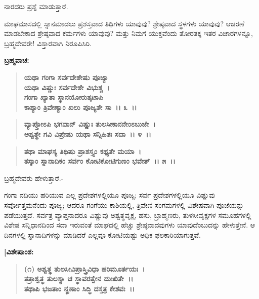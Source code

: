 \begin{flushleft}
ನಾರದರು ಪ್ರಶ್ನೆ ಮಾಡುತ್ತಾರೆ.
\end{flushleft}

ಮಾಘಮಾಸದಲ್ಲಿ ಸ್ನಾನಮಾಡಲು ಪ್ರಶಸ್ತವಾದ ತಿಥಿಗಳು ಯಾವುವು? ಶ್ರೇಷ್ಠವಾದ ಸ್ಥಳಗಳು ಯಾವುವು? ಆಚರಣೆ ಮಾಡಬೇಕಾದ ಶ್ರೇಷ್ಠವಾದ ಕರ್ಮಗಳು ಯಾವುವು? ಮತ್ತು ನಿಮಗೆ ಯುಕ್ತವೆಂದು ತೋರತಕ್ಕ ಇತರ ವಿಚಾರಗಳನ್ನೂ, ಬ್ರಹ್ಮದೇವರೇ! ವಿಸ್ತಾರವಾಗಿ ನಿರೂಪಿಸಿರಿ.

\noindent
\textbf{ಬ್ರಹ್ಮವಾಚ:\enginline{-}}

\begin{verse}
\textbf{ಯಥಾ ಗಂಗಾ ಸರ್ವದೇಶೇಷು ಪೂಜ್ಯಾ}\\\textbf{ಯಥಾ ವಿಷ್ಣುಃ ಸರ್ವದೇಶೇ ವಿಭುಶ್ಚ~। }\\\textbf{ಗಂಗಾ ಖ್ಯಾತಾ ಸ್ಥಾನಯೋರುತ್ಕಟಾಪಿ} \\\textbf{ಕಾಶ್ಯಾಂ ತ್ರಿವೇಣ್ಯಾಂ ಖಲು ಪೂಜ್ಯತೇ ಸಾ~।। ೩~।।}
\end{verse}

\begin{verse}
\textbf{ವ್ಯಾಪ್ತೋಽಪಿ ಭಗವಾನ್ ವಿಷ್ಣುಃ ತುಲಸೀಕಾನನೇಂಽಬುಜೇ~।}\\\textbf{ಅಶ್ವತ್ಥೇ ಗವಿ ವಿಪ್ರೇಷು ಯಥಾ ಸನ್ನಿಹಿತಃ ಸದಾ~।। ೪~।।}
\end{verse}

\begin{verse}
\textbf{ತಥಾ ಮಾಘಸ್ಯ ತಿಥಿಷು ಪ್ರಾಶಸ್ತ್ಯಂ ಕಥ್ಯತೇ ಮಯಾ~।}\\\textbf{ತಸ್ಕಾಂ ಸ್ನಾನಾದಿಕಂ ಸರ್ವಂ ಕೋಟಿಕೋಟಿಗುಣಂ ಭವೇತ್~।। ೫~।।}
\end{verse}

\begin{flushleft}
ಬ್ರಹ್ಮದೇವರು ಹೇಳುತ್ತಾರೆ.-
\end{flushleft}

ಗಂಗಾ ನದಿಯು ಹರಿಯುವ ಎಲ್ಲ ಪ್ರದೇಶಗಳಲ್ಲಿಯೂ ಪೂಜ್ಯ; ಸರ್ವ ಪ್ರದೇಶಗಳಲ್ಲಿಯೂ ವಿಷ್ಣುವು ಸರ್ವೋತ್ತಮನೆಂದು ಪೂಜ್ಯ; ಆದರೂ ಗಂಗೆಯು ಕಾಶಿಯಲ್ಲಿ, ತ್ರಿವೇಣಿ ಸಂಗಮಗಳಲ್ಲಿ ವಿಶೇಷವಾಗಿ ಪೂಜೆಯನ್ನು ಪಡೆಯುತ್ತದೆ. ಸರ್ವತ್ರ ವ್ಯಾಪ್ತನಾದರೂ ವಿಷ್ಣುವು ಅಶ್ವತ್ಥವೃಕ್ಷ, ಹಸು, ಬ್ರಾಹ್ಮಣರು, ತುಳಸೀವೃಕ್ಷಗಳ ಸಮೂಹಗಳಲ್ಲಿ ವಿಶೇಷ ಸನ್ನಿಧಾನದಿಂದ ಸದಾ ಇರುವಂತೆ ಮಾಘದಲ್ಲಿ ಹೆಚ್ಚು ಶ್ರೇಷ್ಠವಾದವುಗಳು ಯಾವುದೆಂಬುದನ್ನು ಹೇಳುತ್ತೇನೆ. ಆ ದಿನಗಳಲ್ಲಿ ಸ್ನಾನಾದಿಗಳನ್ನು ಮಾಡಿದರೆ ಎಲ್ಲವೂ ಕೋಟಿಯಷ್ಟು ಅಧಿಕ ಫಲಕಾರಿಯಾಗುತ್ತವೆ.

\begin{flushleft}
\textbf{[ವಿಶೇಷಾಂಶ:}
\end{flushleft}

\begin{verse}
\textbf{(೧) ಅಶ್ವತ್ಥ ತುಲಸೀವಿಪ್ರಾಸ್ತ್ರಿವಿಧಾ ಹರಿಮೂರ್ತಯಃ~।}\\\textbf{ತತ್ರಾಶ್ವತ್ಥ ತುಲಸ್ಯಾ ಚ ಸ್ಥಾವರತ್ವೇನ ದುಃಖಿತೇ~।।}\\\textbf{ತಥಾಪಿ ಭಜತಾಂ ನೄಣಾಂ ಸಿದ್ಧಿ ದಸ್ತತ್ರ ಕೇಶವಃ~।।} 
\end{verse}

